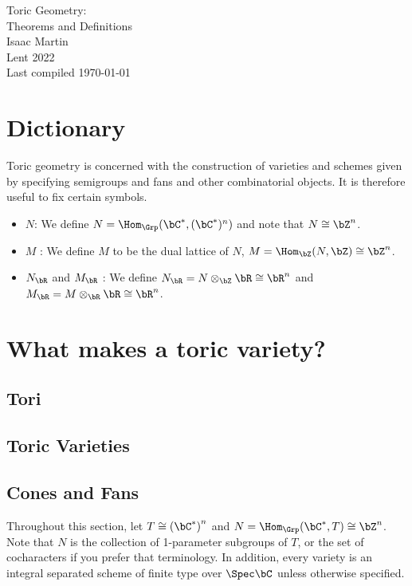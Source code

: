


\pagestyle{empty}
	\LARGE
\begin{center}
	Toric Geometry: \\
	Theorems and Definitions \\
	
	\bigskip
	\Large
	Isaac Martin \\
	Lent 2022 \\
    Last compiled \today
\end{center}
\normalsize
\vspace{-2mm}
\hru

\tableofcontents
\newpage

\setcounter{section}{0}

\section{Dictionary}
Toric geometry is concerned with the construction of varieties and schemes given by specifying semigroups and fans and other combinatorial objects. It is therefore useful to fix certain symbols.
\begin{itemize}
	\item $N$: We define $N = \Hom_{\Grp}(\bC^*, (\bC^*)^n)$ and note that $N \cong \bZ^{n}$. 
	\item $M$ : We define $M$ to be the dual lattice of $N$, $M = \Hom_\bZ(N,\bZ) \cong \bZ^n$.
	\item $N_\bR$ and  $M_\bR$ : We define $N_\bR = N \otimes_\bZ \bR \cong \bR^n$ and $M_\bR = M \otimes_\bR \bR \cong \bR^n$.
\end{itemize}

\newpage
\section{What makes a toric variety?}

\subsection{Tori}
\subsection{Toric Varieties}
\subsection{Cones and Fans}
Throughout this section, let $T \cong \left(\bC^*\right)^n$ and $N = \Hom_{\Grp}(\bC^*, T) \cong \bZ^n$. Note that $N$ is the collection of 1-parameter subgroups of $T$, or the set of cocharacters if you prefer that terminology. In addition, every variety is an integral separated scheme of finite type over $\Spec \bC$ unless otherwise specified.

